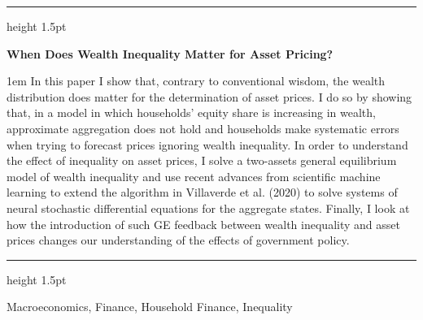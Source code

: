 \documentclass{resume} %
\renewenvironment{abstract}{\begin{adjustwidth}{1em}{}}{\end{adjustwidth}}
\newcommand\cinzel[1]{{\scfamily #1}}
\renewenvironment{rSection}[1]{
\sectionskip
{\color{accent_dark}\textsb{\cinzel{\Large{\textsc{#1}}}}}
\normalsize
\sectionlineskip
{\color{accent_dark}\vspace{-2.5pt}\hrule height 1.5pt}
\begin{list}{}{
\setlength{\leftmargin}{1.5em}
}
\item[]
}{
\end{list}
}
\begin{document}

\begin{rSection}{Work in Progress}


{\sc \textbf{When Does Wealth Inequality Matter for Asset Pricing?}} \\[-1.5em]
{\begin{abstract}
    \footnotesize
    In this paper I show that, contrary to conventional wisdom, the wealth distribution does matter for the determination of asset prices.
    I do so by showing that, in a model in which households' equity share is increasing in wealth, approximate aggregation does not hold and households make systematic errors when trying to forecast prices ignoring wealth inequality.
    In order to understand the effect of inequality on asset prices, I solve a two-assets general equilibrium model of wealth inequality and use recent advances from scientific machine learning to extend the algorithm in Villaverde et al. (2020) to solve systems of neural stochastic differential equations for the aggregate states.
    Finally, I look at how the introduction of such GE feedback between wealth inequality and asset prices changes our understanding of the effects of government policy.
\end{abstract}}
\vspace*{0.5em}

\end{rSection}\vspace*{-2ex}


\begin{rSection}{Fields}

Macroeconomics, Finance, Household Finance, Inequality

\end{rSection}\vspace*{-1.5ex}

\newpage
\end{document}
